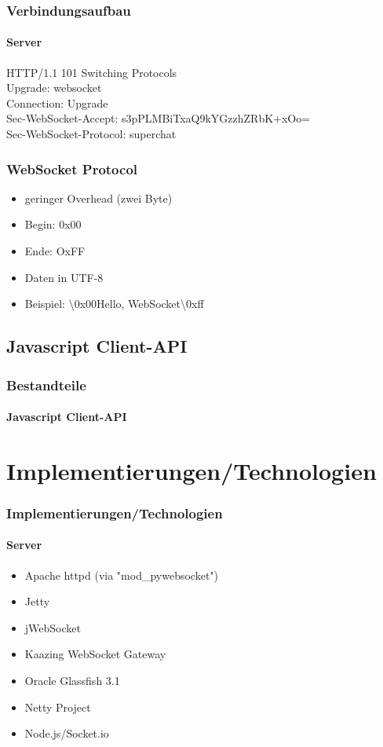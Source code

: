\documentclass{beamer}
\begin{document}
\begin{frame}
\frametitle{Verbindungsaufbau}
\framesubtitle{Server}
HTTP/1.1 101 Switching Protocols\\
Upgrade: websocket\\
Connection: Upgrade\\
Sec-WebSocket-Accept: s3pPLMBiTxaQ9kYGzzhZRbK+xOo=\\
Sec-WebSocket-Protocol: superchat\\
\end{frame}

\begin{frame}
\frametitle{WebSocket Protocol}
\begin{itemize}
\item geringer Overhead (zwei Byte)
\item Begin: 0x00
\item Ende: OxFF
\item Daten in UTF-8
\item Beispiel: \textbackslash 0x00Hello, WebSocket\textbackslash 0xff
\end{itemize}
\end{frame}

\subsection{Javascript Client-API}
\begin{frame}
\frametitle{Bestandteile}
\framesubtitle{Javascript Client-API}
\end{frame}

\section{Implementierungen/Technologien}
\begin{frame}
\frametitle{Implementierungen/Technologien}
\framesubtitle{Server}
\begin{itemize}
\item Apache httpd (via "mod\_pywebsocket")
\item Jetty
\item jWebSocket
\item Kaazing WebSocket Gateway
\item Oracle Glassfish 3.1
\item Netty Project
\item Node.js/Socket.io
\end{itemize}
\end{frame}
\end{document}
